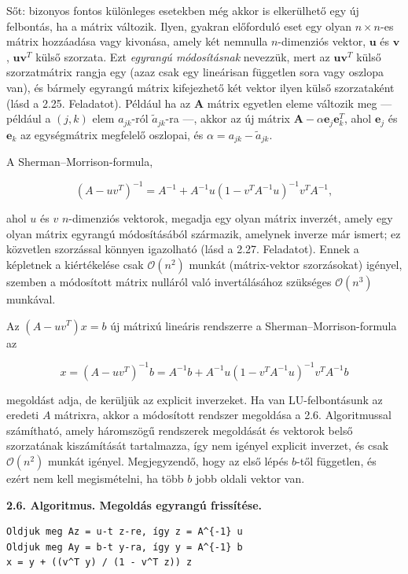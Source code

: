 \documentclass[
  magyar,
  11pt]{article}
\providecommand{\boldsymbol}[1]{\mathbf{#1}}
\begin{document}
Sőt: bizonyos fontos különleges esetekben még akkor is elkerülhető egy
új felbontás, ha a mátrix változik. Ilyen, gyakran előforduló eset egy
olyan \(n \times n\)-es mátrix hozzáadása vagy kivonása, amely két
nemnulla \(n\)-dimenziós vektor, \(\boldsymbol{u}\) és
\(\boldsymbol{v}\), \(\boldsymbol{u}\boldsymbol{v}^T\) külső szorzata.
Ezt \emph{egyrangú módosításnak} nevezzük, mert az
\(\boldsymbol{u}\boldsymbol{v}^T\) külső szorzatmátrix rangja egy (azaz
csak egy lineárisan független sora vagy oszlopa van), és bármely
egyrangú mátrix kifejezhető két vektor ilyen külső szorzataként (lásd a
2.25. Feladatot). Például ha az \(\boldsymbol{A}\) mátrix egyetlen eleme
változik meg --- például a \((j, k)\) elem \(a_{jk}\)-ról
\(\tilde{a}_{jk}\)-ra ---, akkor az új mátrix
\(\boldsymbol{A} - \alpha \boldsymbol{e}_j \boldsymbol{e}_k^T\), ahol
\(\boldsymbol{e}_j\) és \(\boldsymbol{e}_k\) az egységmátrix megfelelő
oszlopai, és \(\alpha = a_{jk} - \tilde{a}_{jk}\).

A Sherman--Morrison-formula,

\[(A - uv^T)^{-1} = A^{-1} + A^{-1}u (1 - v^T A^{-1}u)^{-1} v^T A^{-1},\]

ahol \(u\) és \(v\) \(n\)-dimenziós vektorok, megadja egy olyan mátrix
inverzét, amely egy olyan mátrix egyrangú módosításából származik,
amelynek inverze már ismert; ez közvetlen szorzással könnyen igazolható
(lásd a 2.27. Feladatot). Ennek a képletnek a kiértékelése csak
\(\mathcal{O}(n^2)\) munkát (mátrix-vektor szorzásokat) igényel, szemben
a módosított mátrix nulláról való invertálásához szükséges
\(\mathcal{O}(n^3)\) munkával.

Az \((A - uv^T)x = b\) új mátrixú lineáris rendszerre a
Sherman--Morrison-formula az

\[x = (A - uv^T)^{-1}b = A^{-1}b + A^{-1}u(1 - v^T A^{-1}u)^{-1} v^T A^{-1}b\]

megoldást adja, de kerüljük az explicit inverzeket. Ha van
LU-felbontásunk az eredeti \(A\) mátrixra, akkor a módosított rendszer
megoldása a 2.6. Algoritmussal számítható, amely háromszögű rendszerek
megoldását és vektorok belső szorzatának kiszámítását tartalmazza, így
nem igényel explicit inverzet, és csak \(\mathcal{O}(n^2)\) munkát
igényel. Megjegyzendő, hogy az első lépés \(b\)-től független, és ezért
nem kell megismételni, ha több \(b\) jobb oldali vektor van.

\textbf{2.6. Algoritmus. Megoldás egyrangú frissítése.}

\begin{verbatim}
Oldjuk meg Az = u-t z-re, így z = A^{-1} u
Oldjuk meg Ay = b-t y-ra, így y = A^{-1} b
x = y + ((v^T y) / (1 - v^T z)) z
\end{verbatim}
\end{document}
